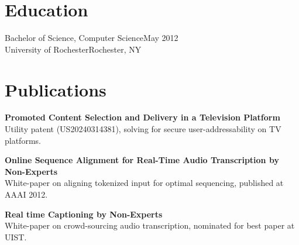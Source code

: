 \section{Education}

  Bachelor of Science, Computer Science\hfill May 2012\\
  University of Rochester\hfill Rochester, NY\\


\section{Publications}

  \textbf{Promoted Content Selection and Delivery in a Television Platform} \\
  Utility patent (US20240314381), solving for secure user-addressability on TV platforms.\\

  \vspace{10pt}    

  \textbf{Online Sequence Alignment for Real-Time Audio Transcription by Non-Experts} \\
  White-paper on aligning tokenized input for optimal sequencing, published at AAAI 2012.

  \vspace{10pt}    

  \textbf{Real time Captioning by Non-Experts} \\
  White-paper on crowd-sourcing audio transcription, nominated for best paper at UIST.
  